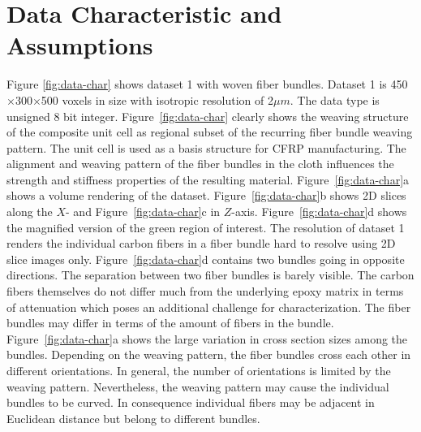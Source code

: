 \section {Data Characteristic and Assumptions}
\label{sec:char_data}
Figure \ref{fig:data-char} shows dataset 1 with woven fiber bundles. Dataset 1 is 450$\times$300$\times$500 voxels in size with isotropic resolution of 2$\mu m$. The data type is unsigned 8 bit integer. Figure~\ref{fig:data-char} clearly shows the weaving structure of the composite unit cell as regional subset of the recurring fiber bundle weaving pattern. The unit cell is used as a basis structure for CFRP manufacturing. The alignment and weaving pattern of the fiber bundles in the cloth influences the strength and stiffness properties of the resulting material. Figure~\ref{fig:data-char}a shows a volume rendering of the dataset. Figure~\ref{fig:data-char}b shows 2D slices along the $X$- and Figure~\ref{fig:data-char}c in $Z$-axis. Figure~\ref{fig:data-char}d shows the magnified version of the green region of interest. 
The resolution of dataset 1 renders the individual carbon fibers in a fiber bundle hard to resolve using 2D slice images only. Figure~\ref{fig:data-char}d contains two bundles going in opposite directions. The separation between two fiber bundles is barely visible. The carbon fibers themselves do not differ much from the underlying epoxy matrix in terms of attenuation which poses an additional challenge for characterization. The fiber bundles may differ in terms of the amount of fibers in the bundle. Figure~\ref{fig:data-char}a shows the large variation in cross section sizes among the bundles.
Depending on the weaving pattern, the fiber bundles cross each other in different orientations. In general, the number of orientations is limited by the weaving pattern. Nevertheless, the weaving pattern may cause the individual bundles to be curved. In consequence individual fibers may be adjacent in Euclidean distance but belong to different bundles. 

